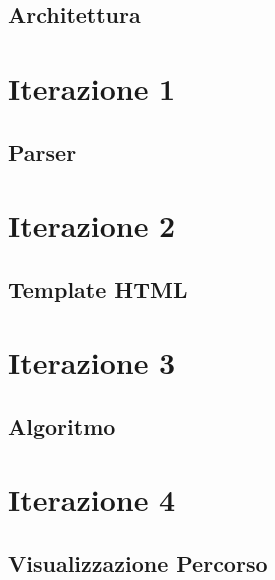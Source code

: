\documentclass[11pt,twoside,openright,italian]{book} %
\begin{document}
\chapter{Architettura} \label{chap:Architettura} \hypertarget{chapter::\theHchapter}{} 

\part{Iterazione 1} \hypertarget{part::\theHpart}{}

\chapter{Parser}\label{chap:Parser} \hypertarget{chapter::\theHchapter}{}


\part{Iterazione 2} \hypertarget{part::\theHpart}{}

\chapter{Template HTML} \label{chap:Template HTML} \hypertarget{chapter::\theHchapter}{}


\part{Iterazione 3} \hypertarget{part::\theHpart}{}

\chapter{Algoritmo} \label{chap:Algoritmo} \hypertarget{chapter::\theHchapter}{}


\part{Iterazione 4} \hypertarget{part::\theHpart}{}

\chapter{Visualizzazione Percorso} \label{chap:Visualizzazione Percorso} \hypertarget{chapter::\theHchapter}{}

\end{document}
